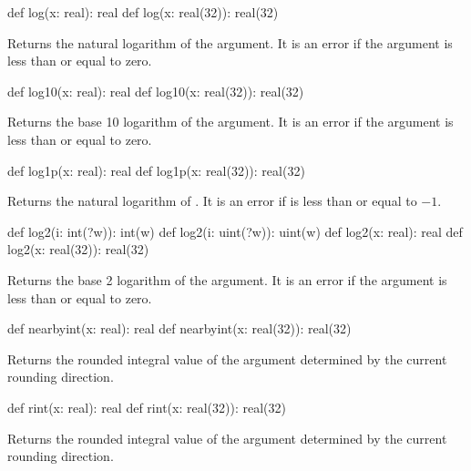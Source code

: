 \begin{protohead}
def log(x: real): real
def log(x: real(32)): real(32)
\end{protohead}
\begin{protobody}
Returns the natural logarithm of the argument.  It is an error if the
argument is less than or equal to zero.
\end{protobody}

\begin{protohead}
def log10(x: real): real
def log10(x: real(32)): real(32)
\end{protohead}
\begin{protobody}
Returns the base 10 logarithm of the argument.  It is an error if the
argument is less than or equal to zero.
\end{protobody}

\begin{protohead}
def log1p(x: real): real
def log1p(x: real(32)): real(32)
\end{protohead}
\begin{protobody}
Returns the natural logarithm of .  It is an error
if  is less than or equal to $-1$.
\end{protobody}

\begin{protohead}
def log2(i: int(?w)): int(w)
def log2(i: uint(?w)): uint(w)
def log2(x: real): real
def log2(x: real(32)): real(32)
\end{protohead}
\begin{protobody}
Returns the base 2 logarithm of the argument.  It is an error if the
argument is less than or equal to zero.
\end{protobody}

\begin{protohead}
def nearbyint(x: real): real
def nearbyint(x: real(32)): real(32)
\end{protohead}
\begin{protobody}
Returns the rounded integral value of the argument determined by the
current rounding direction.
\end{protobody}

\begin{protohead}
def rint(x: real): real
def rint(x: real(32)): real(32)
\end{protohead}
\begin{protobody}
Returns the rounded integral value of the argument determined by the
current rounding direction.
\end{protobody}

